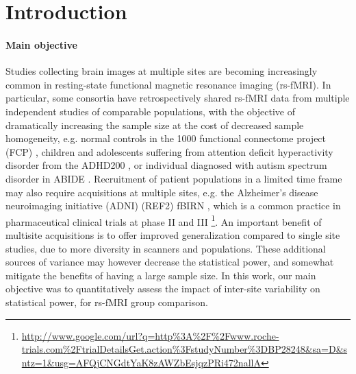 \documentclass[authoryear]{elsarticle}
\begin{document}
\section{Introduction}

\paragraph{Main objective}
Studies collecting brain images at multiple sites are becoming increasingly common in resting-state functional magnetic resonance imaging (rs-fMRI). In particular, some consortia have retrospectively shared rs-fMRI data from multiple independent studies of comparable populations, with the objective of dramatically increasing the sample size at the cost of decreased sample homogeneity, e.g. normal controls in the 1000 functional connectome project (FCP) \citep{Biswal2010}, children and adolescents suffering from attention deficit hyperactivity disorder from the ADHD200 \citep{ADHD200,Fair2012}, or individual diagnosed with autism spectrum disorder in ABIDE \citep{Nielsen2013}. Recruitment of patient populations in a limited time frame may also require acquisitions at multiple sites, e.g. the Alzheimer’s disease neuroimaging initiative (ADNI) \citep{Mueller2005} (REF2) fBIRN \citep{Friedman2006,Friedman2006a}, which is a common practice in pharmaceutical clinical trials at phase II and III \footnote{\url{http://www.google.com/url?q=http%3A%2F%2Fwww.roche-trials.com%2FtrialDetailsGet.action%3FstudyNumber%3DBP28248&sa=D&sntz=1&usg=AFQjCNGdtYaK8zAWZbEsjqzPRi472nallA}}. An important benefit of multisite acquisitions is to offer improved generalization compared to single site studies, due to more diversity in scanners and populations. These additional sources of variance may however decrease the statistical power, and somewhat mitigate the benefits of having a large sample size. In this work, our main objective was to quantitatively assess the impact of inter-site variability on statistical power, for rs-fMRI group comparison.
\end{document}
